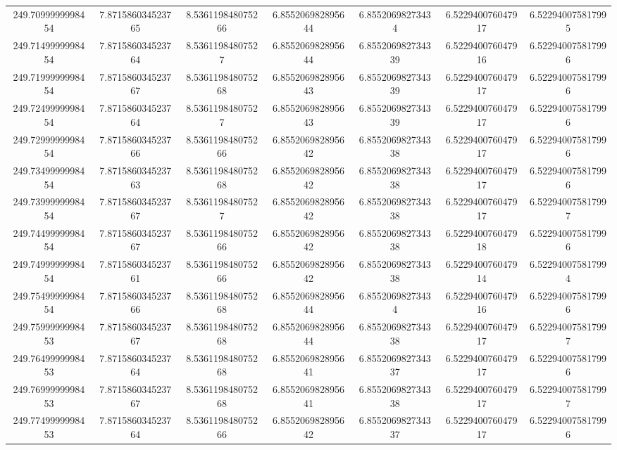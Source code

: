 \begin{center}
{\begin{tabular}{| c | c | c | c | c | c | c |}
249.7099999998454  & 7.871586034523765  & 8.536119848075266  & 6.855206982895644  & 6.85520698273434  & 6.522940076047917  & 6.522940075817995 \\
249.7149999998454  & 7.871586034523764  & 8.53611984807527  & 6.855206982895644  & 6.855206982734339  & 6.522940076047916  & 6.522940075817996 \\
249.7199999998454  & 7.871586034523767  & 8.536119848075268  & 6.855206982895643  & 6.855206982734339  & 6.522940076047917  & 6.522940075817996 \\
249.7249999998454  & 7.871586034523764  & 8.53611984807527  & 6.855206982895643  & 6.855206982734339  & 6.522940076047917  & 6.522940075817996 \\
249.7299999998454  & 7.871586034523766  & 8.536119848075266  & 6.855206982895642  & 6.855206982734338  & 6.522940076047917  & 6.522940075817996 \\
249.7349999998454  & 7.871586034523763  & 8.536119848075268  & 6.855206982895642  & 6.855206982734338  & 6.522940076047917  & 6.522940075817996 \\
249.7399999998454  & 7.871586034523767  & 8.53611984807527  & 6.855206982895642  & 6.855206982734338  & 6.522940076047917  & 6.522940075817997 \\
249.7449999998454  & 7.871586034523767  & 8.536119848075266  & 6.855206982895642  & 6.855206982734338  & 6.522940076047918  & 6.522940075817996 \\
249.7499999998454  & 7.871586034523761  & 8.536119848075266  & 6.855206982895642  & 6.855206982734338  & 6.522940076047914  & 6.522940075817994 \\
249.7549999998454  & 7.871586034523766  & 8.536119848075268  & 6.855206982895644  & 6.85520698273434  & 6.522940076047916  & 6.522940075817996 \\
249.7599999998453  & 7.871586034523767  & 8.536119848075268  & 6.855206982895644  & 6.855206982734338  & 6.522940076047917  & 6.522940075817997 \\
249.7649999998453  & 7.871586034523764  & 8.536119848075268  & 6.855206982895641  & 6.855206982734337  & 6.522940076047917  & 6.522940075817996 \\
249.7699999998453  & 7.871586034523767  & 8.536119848075268  & 6.855206982895641  & 6.855206982734338  & 6.522940076047917  & 6.522940075817997 \\
249.7749999998453  & 7.871586034523764  & 8.536119848075266  & 6.855206982895642  & 6.855206982734337  & 6.522940076047917  & 6.522940075817996 \\

\end{tabular}}
\end{center}
